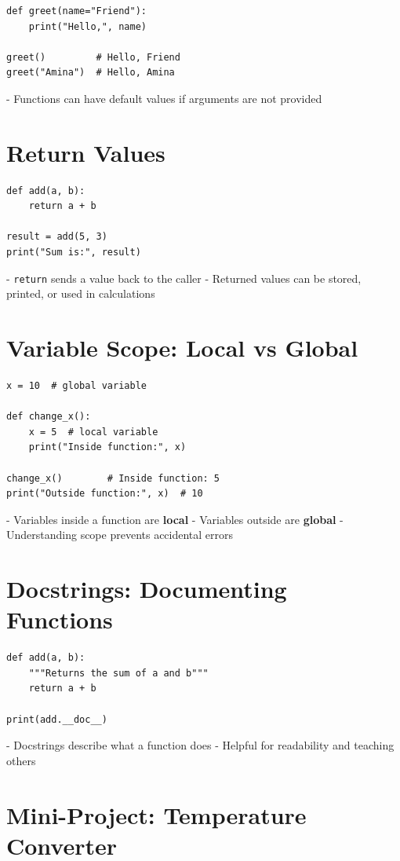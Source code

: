 \begin{verbatim}
def greet(name="Friend"):
    print("Hello,", name)

greet()         # Hello, Friend
greet("Amina")  # Hello, Amina
\end{verbatim}

- Functions can have default values if arguments are not provided

\section{Return Values}

\begin{verbatim}
def add(a, b):
    return a + b

result = add(5, 3)
print("Sum is:", result)
\end{verbatim}

- \texttt{return} sends a value back to the caller  
- Returned values can be stored, printed, or used in calculations

\section{Variable Scope: Local vs Global}

\begin{verbatim}
x = 10  # global variable

def change_x():
    x = 5  # local variable
    print("Inside function:", x)

change_x()        # Inside function: 5
print("Outside function:", x)  # 10
\end{verbatim}

- Variables inside a function are \textbf{local}  
- Variables outside are \textbf{global}  
- Understanding scope prevents accidental errors

\section{Docstrings: Documenting Functions}

\begin{verbatim}
def add(a, b):
    """Returns the sum of a and b"""
    return a + b

print(add.__doc__)
\end{verbatim}

- Docstrings describe what a function does  
- Helpful for readability and teaching others

\section{Mini-Project: Temperature Converter}

